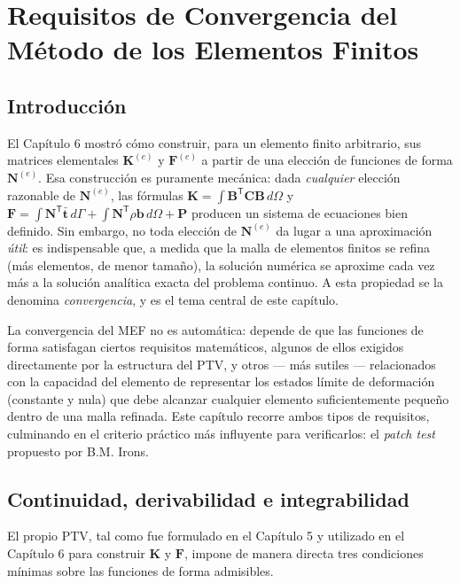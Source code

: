 \chapter{Requisitos de Convergencia del Método de los Elementos Finitos}
\label{chap:cap07-convergencia}

\section{Introducción}

El Capítulo 6 mostró cómo construir, para un elemento finito arbitrario, sus matrices elementales $\bm K^{(e)}$ y $\bm F^{(e)}$ a partir de una elección de funciones de forma $\bm N^{(e)}$. Esa construcción es puramente mecánica: dada \emph{cualquier} elección razonable de $\bm N^{(e)}$, las fórmulas $\bm K = \int \bm B^{\mathsf T}\bm C\bm B\,d\Omega$ y $\bm F = \int\bm N^{\mathsf T}\bar{\bm t}\,d\Gamma + \int\bm N^{\mathsf T}\rho\bm b\,d\Omega + \bm P$ producen un sistema de ecuaciones bien definido. Sin embargo, no toda elección de $\bm N^{(e)}$ da lugar a una aproximación \emph{útil}: es indispensable que, a medida que la malla de elementos finitos se refina (más elementos, de menor tamaño), la solución numérica se aproxime cada vez más a la solución analítica exacta del problema continuo. A esta propiedad se la denomina \emph{convergencia}, y es el tema central de este capítulo.

La convergencia del MEF no es automática: depende de que las funciones de forma satisfagan ciertos requisitos matemáticos, algunos de ellos exigidos directamente por la estructura del PTV, y otros --- más sutiles --- relacionados con la capacidad del elemento de representar los estados límite de deformación (constante y nula) que debe alcanzar cualquier elemento suficientemente pequeño dentro de una malla refinada. Este capítulo recorre ambos tipos de requisitos, culminando en el criterio práctico más influyente para verificarlos: el \emph{patch test} propuesto por B.M. Irons.

\section{Continuidad, derivabilidad e integrabilidad}
\label{sec:cap07-condiciones-basicas}

El propio PTV, tal como fue formulado en el Capítulo 5 y utilizado en el Capítulo 6 para construir $\bm K$ y $\bm F$, impone de manera directa tres condiciones mínimas sobre las funciones de forma admisibles.

